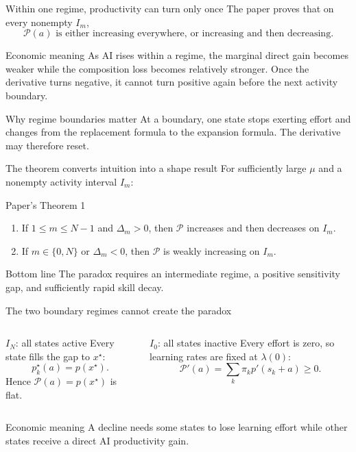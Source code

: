 \documentclass[aspectratio=169,11pt]{beamer}
\newcommand{\calP}{\mathcal{P}}
\newcommand{\econmeaning}[1]{%
  \begin{block}{Economic meaning}
  #1
  \end{block}}
\newcommand{\bottomline}[1]{%
  \begin{alertblock}{Bottom line}
  #1
  \end{alertblock}}
\begin{document}
\begin{frame}{Within one regime, productivity can turn only once}
The paper proves that on every nonempty $I_m$,
\[
\boxed{\calP(a)\text{ is either increasing everywhere,
or increasing and then decreasing}.}
\]
\econmeaning{As AI rises within a regime, the marginal direct gain becomes weaker while the composition loss becomes relatively stronger. Once the derivative turns negative, it cannot turn positive again before the next activity boundary.}
\begin{alertblock}{Why regime boundaries matter}
At a boundary, one state stops exerting effort and changes from the replacement formula to the expansion formula. The derivative may therefore reset.
\end{alertblock}
\end{frame}

\begin{frame}{The theorem converts intuition into a shape result}
For sufficiently large $\mu$ and a nonempty activity interval $I_m$:
\begin{block}{Paper's Theorem 1}
\begin{enumerate}
  \item If $1\le m\le N-1$ and $\Delta_m>0$, then $\calP$ increases and then decreases on $I_m$.
  \item If $m\in\{0,N\}$ or $\Delta_m<0$, then $\calP$ is weakly increasing on $I_m$.
\end{enumerate}
\end{block}
\bottomline{The paradox requires an intermediate regime, a positive sensitivity gap, and sufficiently rapid skill decay.}
\end{frame}

\begin{frame}{The two boundary regimes cannot create the paradox}
\begin{columns}[T,onlytextwidth]
\begin{block}{$I_N$: all states active}
Every state fills the gap to $x^\star$:
\[
p_k^\star(a)=p(x^\star).
\]
Hence $\calP(a)=p(x^\star)$ is flat.
\end{block}
\begin{exampleblock}{$I_0$: all states inactive}
Every effort is zero, so learning rates are fixed at $\lambda(0)$:
\[
\calP'(a)=\sum_k\pi_k p'(s_k+a)\ge0.
\]
\end{exampleblock}
\end{columns}
\econmeaning{A decline needs some states to lose learning effort while other states receive a direct AI productivity gain.}
\end{frame}
\end{document}
